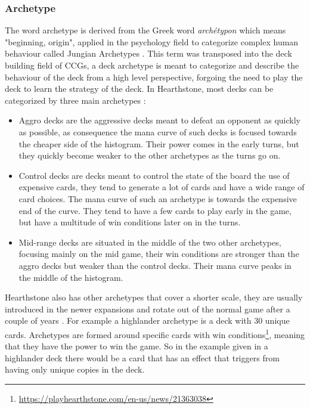 \documentclass{report}
\begin{document}
\subsubsection{Archetype}
\label{archetypes}
	The word archetype is derived from the Greek word {\it{archétypon}} which means "beginning, origin", applied in the psychology field to categorize complex human behaviour called Jungian Archetypes \cite{Robertson2016}. This term was transposed into the deck building field of CCGs, a deck archetype is meant to categorize and describe the behaviour of the deck from a high level perspective, forgoing the need to play the deck to learn the strategy of the deck. In Hearthstone, most decks can be categorized by three main archetypes \cite{Judlick}:
\begin{itemize}

\item Aggro decks are the aggressive decks meant to defeat an opponent as quickly as possible, as consequence the mana curve of such decks is focused towards the cheaper side of the histogram. Their power comes in the early turns, but they quickly become weaker to the other archetypes as the turns go on.
\item Control decks are decks meant to control the state of the board the use of expensive cards, they tend to generate a lot of cards and have a wide range of card choices. The mana curve of such an archetype is towards the expensive end of the curve. They tend to have a few cards to play early in the game, but have a multitude of win conditions later on in the turns.

\item Mid-range decks are situated in the middle of the two other archetypes, focusing mainly on the mid game, their win conditions are stronger than the aggro decks but weaker than the control decks. Their mana curve peaks in the middle of the histogram.
\end{itemize}

Hearthstone also has other archetypes that cover a shorter scale, they are usually introduced in the newer expansions and rotate out of the normal game after a couple of years \cite{Standard}. For example a highlander archetype is a deck with 30 unique cards. Archetypes are formed around specific cards with win conditions\footnote{\url{https://playhearthstone.com/en-us/news/21363038}}, meaning that they have the power to win the game. So in the example given in a highlander deck there would be a card that has an effect that triggers from having only unique copies in the deck.
 
\end{document}
